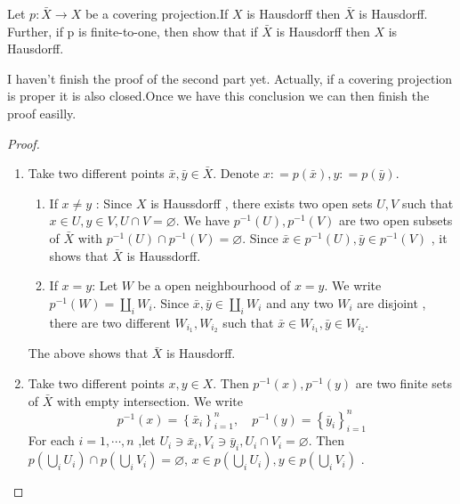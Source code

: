 \documentclass[../main.tex]{subfiles}
\begin{document}
\begin{proposition}{}{}
    Let \(  p: \bar{X}  \to X\) be a covering projection.If \(  X  \) is Hausdorff then \(  \bar{X}  \) is Hausdorff. Further, if p is finite-to-one, then show that if \(  \bar{X}  \) is Hausdorff then \(  X  \) is Hausdorff.      
\end{proposition}
\begin{note}
    I haven't finish the proof of the second part yet. Actually, if a covering projection is proper it is also closed.Once we have this conclusion we can then finish the proof easilly.
\end{note}
\begin{proof}
    \begin{enumerate}
        \item 
        Take two different points \(  \bar{x},\bar{y} \in \bar{X}  \). Denote \(  x : =  p\left( \bar{x} \right), y : =  p\left( \bar{y} \right)    \). 
        \begin{enumerate}
        \item  If \(  x\neq y  \) : Since \(  X  \) is Haussdorff , there exists two open sets \(  U,V  \) such that \(  x\in U, y \in V, U\cap V= \varnothing  \).  We have \(  p^{-1} \left( U \right)   , p^{-1} \left( V \right) \) are two open subsets of \(  \bar{X}  \)  with \(  p^{-1} \left( U \right)\cap p^{-1} \left( V \right)= \varnothing    \). Since \(  \bar{x} \in p^{-1} \left( U \right), \bar{y}\in p^{-1} \left( V \right)    \)  , it shows that  \(  \bar{X}  \) is Haussdorff. 
        \item  If \(  x= y  \): Let \(  W  \) be a open neighbourhood of \(  x= y  \). We write \(  p^{-1} \left( W \right) = \coprod  _{i}W_{i}  \).  Since \(  \bar{x},\bar{y}\in \coprod  _{i} W_{i}  \)    and any two \(  W_{i}  \) are disjoint   , there are two different \(  W_{i_1},W_{i_2}  \) such that \(  \bar{x}\in W_{i_1}, \bar{y}\in  W_{i_2}  \). 
    \end{enumerate}
     The above shows that \(  \bar{X}  \) is Hausdorff.
     \item  Take two different points \(  x,y \in X  \). Then \(  p^{-1} \left( x \right), p^{-1} \left( y \right)    \)  are two finite sets of \(  \bar{X}  \) with empty intersection. We write \[
     p^{-1} \left( x \right)= \left\{ \bar{x}_{i} \right\}_{i= 1}^{n} ,\quad p^{-1} \left( y \right)= \left\{ \bar{y}_{i} \right\}_{i= 1}^{n}  
     \]For each \(  i= 1,\cdots ,n  \) ,let \(  U_{i}\ni \bar{x}_{i},V_{i}\ni \bar{y}_{i}, U_{i}\cap V_{i}= \varnothing  \). Then \(  p\left( \bigcup _{i}U_{i} \right)\cap  p\left( \bigcup _{i}V_{i} \right)= \varnothing    \), \(  x \in p\left( \bigcup _{i}U_{i} \right), y \in p\left( \bigcup _{i}V_{i} \right)    \)   .
    \end{enumerate}
    
\end{proof}
\end{document}
